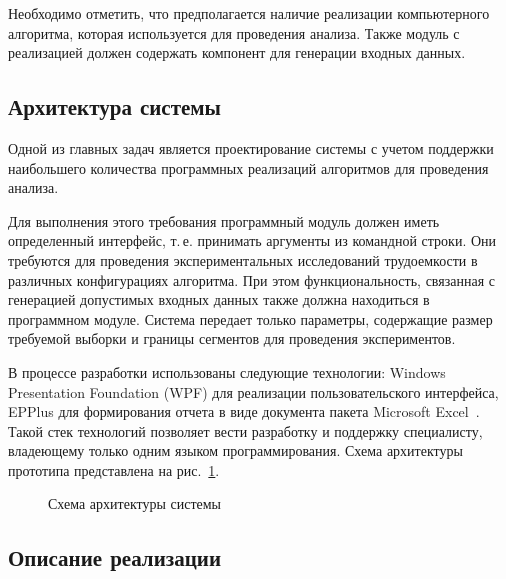 \documentclass[a4paper, article, 14pt]{extarticle}
\begin{document}
Необходимо отметить, что предполагается наличие реализации компьютерного алгоритма, которая используется для проведения анализа. Также модуль с реализацией должен содержать компонент для генерации входных данных.

\subsection{Архитектура системы}\label{sec:arhitecture}

Одной из главных задач является проектирование системы с учетом поддержки наибольшего количества программных реализаций алгоритмов для проведения анализа.

Для выполнения этого требования программный модуль должен иметь определенный интерфейс, т.\,е. принимать аргументы из командной строки. Они требуются для проведения экспериментальных исследований трудоемкости в различных конфигурациях алгоритма. При этом функциональность, связанная с генерацией допустимых входных данных также должна находиться в программном модуле. Система передает только параметры, содержащие размер требуемой выборки и границы сегментов для проведения экспериментов.

В процессе разработки использованы следующие технологии: Windows Presentation Foundation (WPF) для реализации пользовательского интерфейса, EPPlus для формирования отчета в виде документа пакета Microsoft Excel~\cite{excel}. Такой стек технологий позволяет вести разработку и поддержку специалисту, владеющему только одним языком программирования. Схема архитектуры прототипа представлена на рис.~\ref{fig:arhitecture}.

\begin{figure}[h]
	\caption{Схема архитектуры системы}
	\label{fig:arhitecture}
\end{figure}
\vskip4mm

\subsection{Описание реализации}\label{sec:implementation}
\end{document}
